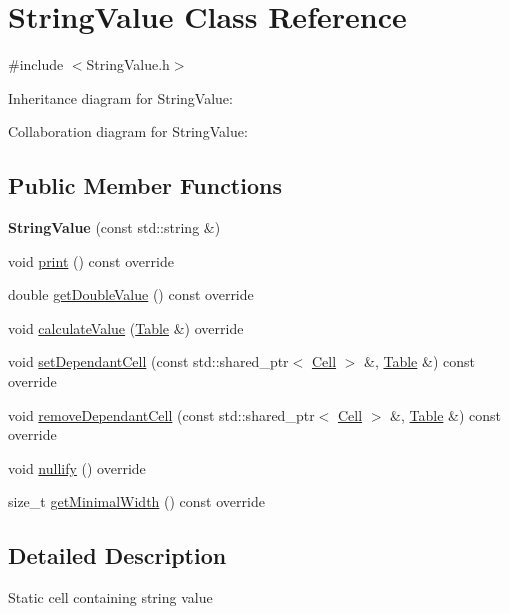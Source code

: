 \hypertarget{classStringValue}{}\section{String\+Value Class Reference}
\label{classStringValue}


{\ttfamily \#include $<$String\+Value.\+h$>$}



Inheritance diagram for String\+Value\+:


Collaboration diagram for String\+Value\+:
\subsection*{Public Member Functions}
\begin{DoxyCompactItemize}
\item 
\mbox{\label{classStringValue_a07d958ba394125f90291a8f5878bdc68}} 
{\bfseries String\+Value} (const std\+::string \&)
\item 
void \hyperlink{classStringValue_a2b7b078d04a0c9994013adb0cc3e699a}{print} () const override
\item 
double \hyperlink{classStringValue_a22bcc6ee544f8ad6e91ddb31a936bf66}{get\+Double\+Value} () const override
\item 
void \hyperlink{classStringValue_a36936ad0f3beac2f197192fba48d8580}{calculate\+Value} (\hyperlink{classTable}{Table} \&) override
\item 
void \hyperlink{classStringValue_a652b9f611082953f3f6f3938657793d1}{set\+Dependant\+Cell} (const std\+::shared\+\_\+ptr$<$ \hyperlink{classCell}{Cell} $>$ \&, \hyperlink{classTable}{Table} \&) const override
\item 
void \hyperlink{classStringValue_aa57e3e4038a415eeb97e09ff8a7bbe35}{remove\+Dependant\+Cell} (const std\+::shared\+\_\+ptr$<$ \hyperlink{classCell}{Cell} $>$ \&, \hyperlink{classTable}{Table} \&) const override
\item 
void \hyperlink{classStringValue_a949dd5939db253c347ce8936b0c5f368}{nullify} () override
\item 
size\+\_\+t \hyperlink{classStringValue_a4c411db1254d987504a6014e296dd565}{get\+Minimal\+Width} () const override
\end{DoxyCompactItemize}


\subsection{Detailed Description}
Static cell containing string value 


